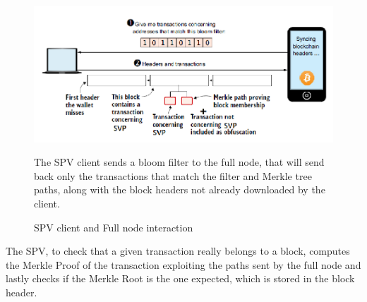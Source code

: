 \begin{figure}[htbp]
   \centering
   \includegraphics{images/bitcoin_spv.png}
   \caption{SPV client and Full node interaction}
   The SPV client sends a bloom filter to the full node, that will send back only the transactions that match the filter and Merkle tree paths, along with the block headers not already downloaded by the client.
   \label{fig:bitcoin_spv}
\end{figure}

The SPV, to check that a given transaction really belongs to a block, computes the Merkle Proof of the transaction exploiting the paths sent by the full node and lastly checks if the Merkle Root is the one expected, which is stored in the block header.